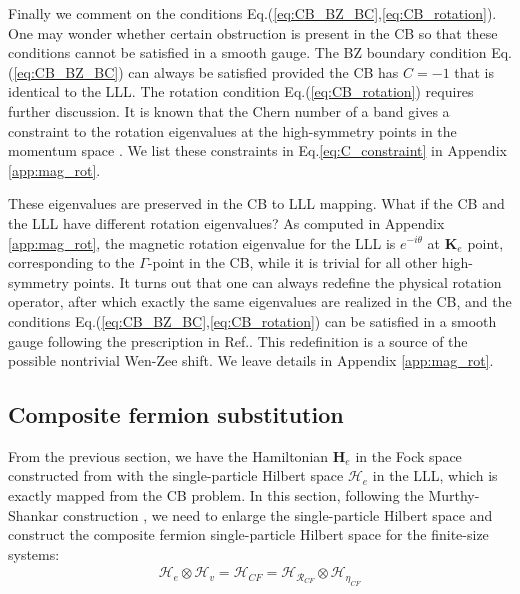 Finally we comment on the conditions Eq.(\ref{eq:CB_BZ_BC},\ref{eq:CB_rotation}). One may wonder whether certain obstruction is present in the CB so that these conditions cannot be satisfied in a smooth gauge. The BZ boundary condition Eq.(\ref{eq:CB_BZ_BC}) can always be satisfied provided the CB has $C=-1$ that is identical to the LLL. The rotation condition Eq.(\ref{eq:CB_rotation}) requires further discussion. It is known that the Chern number of a band gives a constraint to the rotation eigenvalues at the high-symmetry points in the momentum space \cite{fang2012bulk}. We list these constraints in Eq.\eqref{eq:C_constraint} in Appendix \ref{app:mag_rot}.

These eigenvalues are preserved in the CB to LLL mapping. What if the CB and the LLL have different rotation eigenvalues? As computed in Appendix \ref{app:mag_rot}, the magnetic rotation eigenvalue for the LLL is $e^{-i\theta}$ at $\mathbf K_e$ point, corresponding to the $\Gamma$-point in the CB, while it is trivial for all other high-symmetry points. It turns out that one can always redefine the physical rotation operator, after which exactly the same eigenvalues are realized in the CB, and the conditions Eq.(\ref{eq:CB_BZ_BC},\ref{eq:CB_rotation}) can be satisfied in a smooth gauge following the prescription in Ref.\cite{jian2013crystal}. This redefinition is a source of the possible nontrivial Wen-Zee shift. We leave details in Appendix \ref{app:mag_rot}.

\subsection{Composite fermion substitution}\label{sec:CF_substitution}
From the previous section, we have the Hamiltonian $\mathbf H_e$ in the Fock space constructed from with the single-particle Hilbert space $\mathcal H_e$ in the LLL, which is exactly mapped from the CB problem. In this section, following the Murthy-Shankar construction \cite{murthy2003hamiltonian}, we need to enlarge the single-particle Hilbert space and construct the composite fermion single-particle Hilbert space for the finite-size systems:
\begin{align}
\mathcal H_e\otimes \mathcal H_v=\mathcal H_{CF}=\mathcal H_{\mathcal R_{CF}}\otimes \mathcal H_{\eta_{CF}}\label{eq:Hilbert_decomposition}
\end{align}

